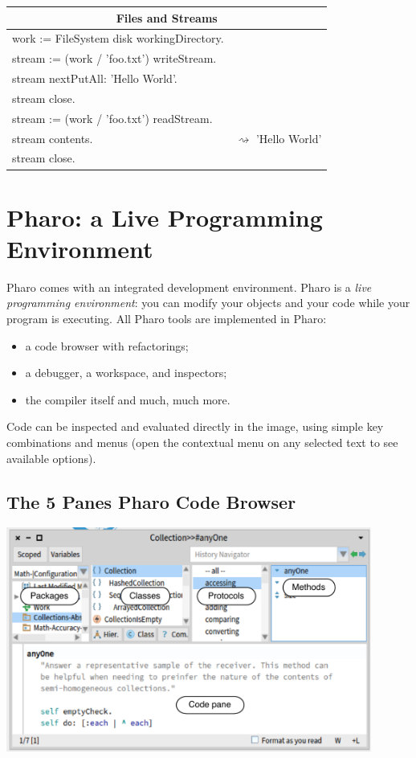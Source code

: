 \documentclass[notumble]{leaflet}
\begin{document}
\noindent
\begin{tabularx}{\linewidth}{@{}lX@{}}
     \toprule
     \multicolumn{2}{c}{\textbf{Files and Streams}}\\
      \midrule
work := FileSystem disk workingDirectory. \\
stream := (work / 'foo.txt') writeStream. \\
stream nextPutAll: 'Hello World'. \\
stream close. \\
stream := (work / 'foo.txt') readStream. \\
stream contents. & $\rightsquigarrow$ 'Hello World' \\
stream close.
\end{tabularx}

\section{Pharo: a Live Programming Environment}

Pharo comes with an integrated development environment. Pharo
is a \emph{live programming environment}: you can modify your objects
and your code while your program is executing. All Pharo tools are
implemented in Pharo:
\begin{itemize}
\item a code browser with refactorings;
\item a debugger, a workspace, and inspectors;
\item the compiler itself and much, much more. 
\end{itemize}

Code can be inspected and evaluated directly in the image, using
simple key combinations and menus (open the contextual menu on any
selected text to see available options).


\subsection{The 5 Panes Pharo Code Browser}

\begin{center}
  \includegraphics[width=0.9\textwidth]{nautilus-anotated}
\end{center}
\end{document}
